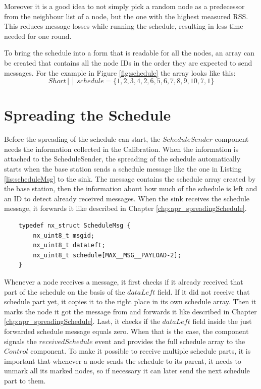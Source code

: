 Moreover it is a good idea to not simply pick a random node as a predecessor from the neighbour list of a node, but the one with the highest measured RSS. This reduces message losses while running the schedule, resulting in less time needed for one round.  

To bring the schedule into a form that is readable for all the nodes, an array can be created that contains all the node IDs in the order they are expected to send messages. For the example in Figure \ref{fig:schedule} the array looks like this: 
\[ Short[]\ schedule = \{1, 2, 3, 4, 2, 6, 5, 6, 7, 8, 9, 10, 7, 1\}\]     
\section{Spreading the Schedule}
Before the spreading of the schedule can start, the $ScheduleSender$ component needs the information collected in the Calibration. When the information is attached to the ScheduleSender, the spreading of the schedule automatically starts when the base station sends a schedule message like the one in Listing \ref{lis:scheduleMsg} to the sink. The message contains the schedule array created by the base station, then the information about how much of the schedule is left and an ID to detect already received messages. When the sink receives the schedule message, it forwards it like described in Chapter \ref{chp:apr_spreadingSchedule}.

\begin{lstlisting}
	typedef nx_struct ScheduleMsg {
		nx_uint8_t msgid;	
		nx_uint8_t dataLeft;
		nx_uint8_t schedule[MAX__MSG__PAYLOAD-2];
	}
\end{lstlisting}

Whenever a node receives a message, it first checks if it already received that part of the schedule on the basis of the $dataLeft$ field. If it did not receive that schedule part yet, it copies it to the right place in its own schedule array. Then it marks the node it got the message from and forwards it like described in Chapter \ref{chp:apr_spreadingSchedule}. Last, it checks if the $dataLeft$ field inside the just forwarded schedule message equals zero. When that is the case, the component signals the $receivedSchedule$ event and provides the full schedule array to the $Control$ component.
To make it possible to receive multiple schedule parts, it is important that whenever a node sends the schedule to its parent, it needs to unmark all its marked nodes, so if necessary it can later send the next schedule part to them.

